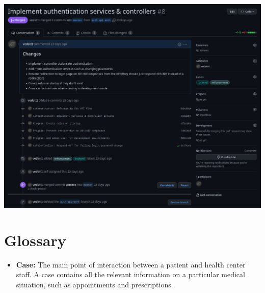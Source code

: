 \documentclass[a4paper, 12pt, titlepage]{article}
\begin{document}
  \includegraphics[width=\linewidth]{github_ui}

  \section{Glossary}

  \begin{itemize}
    \item \textbf{Case:} The main point of interaction between a patient and health center staff.
      A case contains all the relevant information on a particular medical situation,
      such as appointments and prescriptions.

  \end{itemize}
\end{document}
